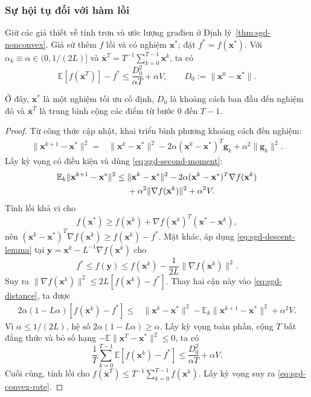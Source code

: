 \subsubsection{Sự hội tụ đối với hàm lồi}

\begin{theorem}\label{thm:sgd-convex}
Giữ các giả thiết về tính trơn và ước lượng građien ở
Định lý~\ref{thm:sgd-nonconvex}. Giả sử thêm $f$ lồi và có nghiệm
$\mathbf{x}^{*}$; đặt $f^{*}=f(\mathbf{x}^{*})$.
Với $\alpha_k\equiv\alpha\in(0,1/(2L)]$ và
$\overline{\mathbf{x}}^{T}=T^{-1}\sum_{k=0}^{T-1}\mathbf{x}^{k}$, ta có
\begin{equation}
 \mathbb{E}[f(\overline{\mathbf{x}}^{T})]-f^{*}
 \leq\frac{D_0^2}{\alpha T}+\alpha V,
 \qquad D_0:=\|\mathbf{x}^{0}-\mathbf{x}^{*}\|.
 \label{eq:sgd-convex-rate}
\end{equation}
\end{theorem}
Ở đây, $\mathbf{x}^{*}$ là một nghiệm tối ưu cố định,
$D_0$ là khoảng cách ban đầu đến nghiệm đó và
$\overline{\mathbf{x}}^{T}$ là trung bình cộng các điểm từ bước $0$ đến $T-1$.

\begin{proof}
Từ công thức cập nhật, khai triển bình phương khoảng cách đến nghiệm:
\begin{align*}
 \|\mathbf{x}^{k+1}-\mathbf{x}^{*}\|^2
 ={}&\|\mathbf{x}^{k}-\mathbf{x}^{*}\|^2
 -2\alpha(\mathbf{x}^{k}-\mathbf{x}^{*})^T\mathbf{g}_k
 +\alpha^2\|\mathbf{g}_k\|^2.
\end{align*}
Lấy kỳ vọng có điều kiện và dùng \eqref{eq:sgd-second-moment}:
\begin{align}
 \mathbb{E}_k\|\mathbf{x}^{k+1}-\mathbf{x}^{*}\|^2
 \leq{}&\|\mathbf{x}^{k}-\mathbf{x}^{*}\|^2
 -2\alpha(\mathbf{x}^{k}-\mathbf{x}^{*})^T\nabla f(\mathbf{x}^{k})
 \notag\\
 &+\alpha^2\|\nabla f(\mathbf{x}^{k})\|^2+\alpha^2 V.
 \label{eq:sgd-distance}
\end{align}
Tính lồi khả vi cho
\[
 f(\mathbf{x}^{*})\geq f(\mathbf{x}^{k})+
 \nabla f(\mathbf{x}^{k})^T(\mathbf{x}^{*}-\mathbf{x}^{k}),
\]
nên $(\mathbf{x}^{k}-\mathbf{x}^{*})^T\nabla f(\mathbf{x}^{k})
\geq f(\mathbf{x}^{k})-f^{*}$.
Mặt khác, áp dụng \eqref{eq:sgd-descent-lemma} tại
$\mathbf{y}=\mathbf{x}^{k}-L^{-1}\nabla f(\mathbf{x}^{k})$ cho
\[
 f^{*}\leq f(\mathbf{y})\leq f(\mathbf{x}^{k})-
             \frac{1}{2L}\|\nabla f(\mathbf{x}^{k})\|^2.
\]
Suy ra $\|\nabla f(\mathbf{x}^{k})\|^2
\leq2L[f(\mathbf{x}^{k})-f^{*}]$. Thay hai cận này vào
\eqref{eq:sgd-distance}, ta được
\begin{align*}
 2\alpha(1-L\alpha)[f(\mathbf{x}^{k})-f^{*}]
 \leq{}&\|\mathbf{x}^{k}-\mathbf{x}^{*}\|^2
       -\mathbb{E}_k\|\mathbf{x}^{k+1}-\mathbf{x}^{*}\|^2
       +\alpha^2V.
\end{align*}
Vì $\alpha\leq1/(2L)$, hệ số $2\alpha(1-L\alpha)\geq\alpha$.
Lấy kỳ vọng toàn phần, cộng $T$ bất đẳng thức và bỏ số hạng
$-\mathbb{E}\|\mathbf{x}^{T}-\mathbf{x}^{*}\|^2\leq0$, ta có
\[
 \frac{1}{T}\sum_{k=0}^{T-1}\mathbb{E}[f(\mathbf{x}^{k})-f^{*}]
 \leq\frac{D_0^2}{\alpha T}+\alpha V.
\]
Cuối cùng, tính lồi cho
$f(\overline{\mathbf{x}}^{T})\leq T^{-1}\sum_{k=0}^{T-1}f(\mathbf{x}^{k})$.
Lấy kỳ vọng suy ra \eqref{eq:sgd-convex-rate}.
\end{proof}


